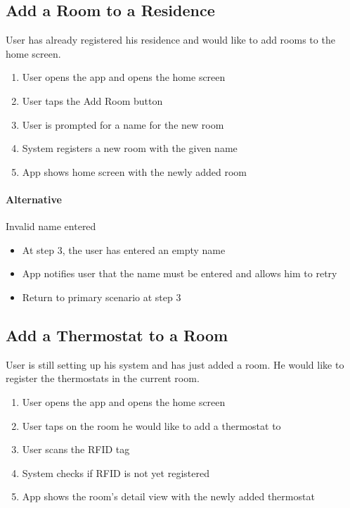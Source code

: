\subsection{Add a Room to a Residence}
User has already registered his residence and would like to add rooms to the home screen.
\begin{enumerate}
    \item User opens the app and opens the home screen
    \item User taps the Add Room button
    \item User is prompted for a name for the new room
    \item System registers a new room with the given name 
    \item App shows home screen with the newly added room
\end{enumerate}

\paragraph{Alternative} Invalid name entered
\begin{itemize}
    \item At step 3, the user has entered an empty name
    \item App notifies user that the name must be entered and allows him to retry
    \item Return to primary scenario at step 3
\end{itemize}

\subsection{Add a Thermostat to a Room}
User is still setting up his system and has just added a room. He would like to register the thermostats in the current room.
\begin{enumerate}
    \item User opens the app and opens the home screen
    \item User taps on the room he would like to add a thermostat to
    \item User scans the RFID tag
    \item System checks if RFID is not yet registered
    \item App shows the room's detail view with the newly added thermostat
\end{enumerate}


